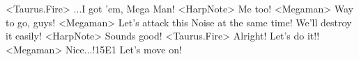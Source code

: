 <Taurus.Fire> ...I got 'em, Mega Man! 
<HarpNote> Me too! 
<Megaman> Way to go, guys! 
<Megaman> Let's attack this Noise at the same time! We'll destroy it easily! 
<HarpNote> Sounds good! 
<Taurus.Fire> Alright! Let's do it!! 
<Megaman> Nice...!{15}{E1} Let's move on! 
